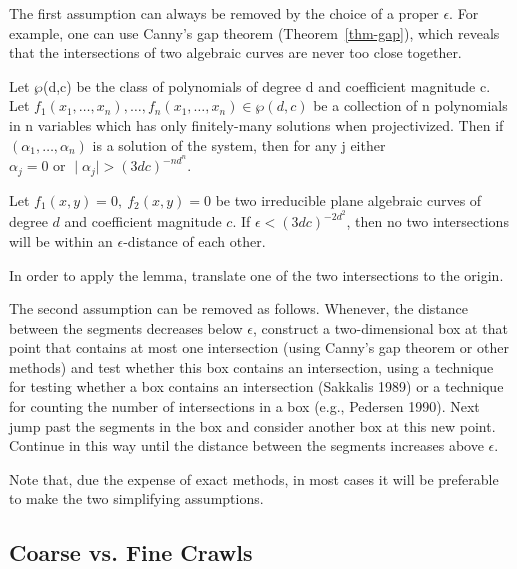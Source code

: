 The first assumption can always be removed by the choice of a proper $\epsilon$.
For example, one can use Canny's gap theorem (Theorem~\ref{thm-gap}), which 
reveals that the intersections of two algebraic curves are never too close together.

\begin{lemma}
\label{thm-gap}
Let $\wp$(d,c) be the class of polynomials of degree d and coefficient magnitude c.
Let $f_{1}(x_{1},\ldots,x_{n}),\ldots,f_{n}(x_{1},\ldots,x_{n}) \in \wp(d,c)$
be a collection of n polynomials in n variables which has only 
finitely-many solutions when projectivized.
Then if $(\alpha_{1},\ldots,\alpha_{n})$ is a solution of the system,
then for any j either
$\alpha_{j} = 0 \mbox{\ \ \ \ or \ \ \ } \mid \alpha_{j} \mid > (3dc)^{-nd^{n}}$. \QED
\end{lemma}

\begin{corollary}
\label{cor-gap}
Let $f_{1}(x,y) = 0,\ f_{2}(x,y) = 0$ be two irreducible plane algebraic curves of degree 
$d$ and coefficient magnitude $c$.
If $\epsilon < (3dc)^{-2d^{2}}$, then no two intersections will 
be within an $\epsilon$-distance of each other.
%
%
\end{corollary}
In order to apply the lemma, translate one of the two intersections to the origin.
\QED

The second assumption can be removed as follows.
Whenever, the distance between the segments decreases below $\epsilon$,
construct a two-dimensional box at that point that contains at most one
intersection (using Canny's gap theorem or other methods)
and test whether this box contains an intersection, using a technique for testing
whether a box contains an intersection (Sakkalis 1989) or 
a technique for counting the number of intersections in a box (e.g., Pedersen 1990).
Next jump past the segments in the box and consider another box at this new point.
Continue in this way until the distance between the segments increases above $\epsilon$.

Note that, due the expense of exact methods, 
in most cases it will be preferable to make the two simplifying assumptions.

\subsection{Coarse vs. Fine Crawls}

